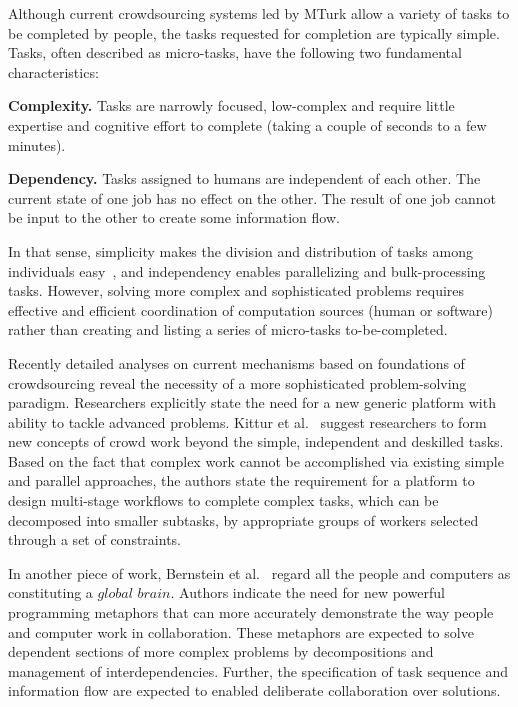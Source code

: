 Although current crowdsourcing systems led by MTurk allow a variety of tasks 
to be completed by people, the tasks requested for completion are typically simple. 
Tasks, often described as micro-tasks, have the following two fundamental characteristics:

\textbf{Complexity.} Tasks are narrowly focused, low-complex and require 
little expertise and cognitive effort to complete (taking a couple of seconds to 
a few minutes).

\textbf{Dependency.} Tasks assigned to humans are independent of each other. 
The current state of one job has no effect on the other. The result of one job cannot 
be input to the other to create some information flow.

In that sense, simplicity makes the division and distribution of tasks among 
individuals easy~\cite{Zhang2011}, and independency enables parallelizing 
and bulk-processing tasks. However, solving more complex and sophisticated 
problems requires effective and efficient coordination of computation sources 
(human or software) rather than creating and listing a series of micro-tasks 
to-be-completed.

Recently detailed analyses on current mechanisms based on foundations of 
crowdsourcing reveal the necessity of a more sophisticated problem-solving 
paradigm. Researchers explicitly state the need for a new generic platform 
with ability to tackle advanced problems. Kittur et al.~\cite{Kittur2013} 
suggest researchers to form new concepts of crowd work beyond 
the simple, independent and deskilled tasks. Based on the fact that complex 
work cannot be accomplished via existing simple and parallel approaches,
the authors state the requirement for a platform to design multi-stage workflows 
to complete complex tasks, which can be decomposed into smaller subtasks, 
by appropriate groups of workers selected through a set of constraints.

In another piece of work, Bernstein et al.~\cite{Bernstein2012} regard all the 
people and computers as constituting a $global$ $brain$. Authors indicate the 
need for new powerful programming metaphors that can more accurately 
demonstrate the way people and computer work in collaboration. These 
metaphors are expected to solve dependent sections of more complex problems by 
decompositions and management of interdependencies. Further, the specification 
of task sequence and information flow are expected to enabled deliberate 
collaboration over solutions.

